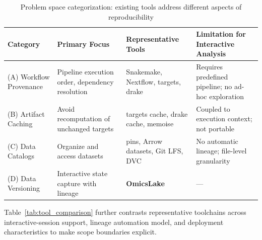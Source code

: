 \documentclass[11pt,a4paper]{article}
\begin{document}
\begin{table}[H]
\centering
\caption{Problem space categorization: existing tools address different aspects of reproducibility}
\label{tab:problem_space}
\begin{tabular}{lp{3cm}p{3.5cm}p{4cm}}
\toprule
\textbf{Category} & \textbf{Primary Focus} & \textbf{Representative Tools} & \textbf{Limitation for Interactive Analysis} \\
\midrule
(A) Workflow Provenance & Pipeline execution order, dependency resolution & Snakemake, Nextflow, targets, drake & Requires predefined pipeline; no ad-hoc exploration \\
(B) Artifact Caching & Avoid recomputation of unchanged targets & targets cache, drake cache, memoise & Coupled to execution context; not portable \\
(C) Data Catalogs & Organize and access datasets & pins, Arrow datasets, Git LFS, DVC & No automatic lineage; file-level granularity \\
(D) Data Versioning & Interactive state capture with lineage & \textbf{OmicsLake} & --- \\
\bottomrule
\end{tabular}
\end{table}

Table~\ref{tab:tool_comparison} further contrasts representative toolchains across interactive-session support, lineage automation model, and deployment characteristics to make scope boundaries explicit.
\end{document}
